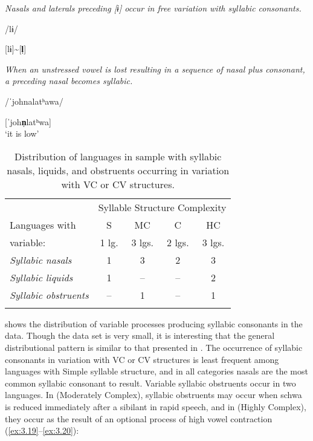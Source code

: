 \ea\label{ex:3.17}

\textit{Nasals and laterals preceding [ɨ] occur in free variation with syllabic consonants.}

/lɨ/

[lɨ]{\textasciitilde}[\textbf{l̩}]
\citep[31]{Gerner2013}
\z

\ea\label{ex:3.18}

\textit{When an unstressed vowel is lost resulting in a sequence of nasal plus consonant, a preceding nasal becomes syllabic.}

/ˈjohnalatʰawa/

[ˈjoh\textbf{n̩}latʰwa]\\
\glt ‘it is low’
\citep[262--263]{Eberhard2009}
\z

\begin{table}
\begin{tabular}{lcccc}
\lsptoprule
 & \multicolumn{4}{c}{Syllable Structure Complexity}\\\cmidrule(lr){2-5}
 Languages with  & S & MC & C & HC\\
   variable:     &   1 lg. & 3 lgs. &  2 lgs. & 3 lgs.\\\midrule
 \textit{Syllabic nasals}     & 1 & 3 & 2 & 3\\
 \textit{Syllabic liquids}    & 1 & -- & -- & 2\\
 \textit{Syllabic obstruents} & -- & 1 & -- & 1\\
\lspbottomrule
\end{tabular}
\caption{\label{tab:3.7}Distribution of languages in sample with syllabic nasals, liquids, and obstruents occurring in variation with VC or CV structures.}
\end{table}

   shows the distribution of variable processes producing syllabic consonants in the data. Though the data set is very small, it is interesting that the general distributional pattern is similar to that presented in . The occurrence of syllabic consonants in variation with VC or CV structures is least frequent among languages with Simple syllable structure, and in all categories nasals are the most common syllabic consonant to result. Variable syllabic obstruents occur in two languages. In  (Moderately Complex), syllabic obstruents may occur when schwa is reduced immediately after a sibilant in rapid speech, and in  (Highly Complex), they occur as the result of an optional process of high vowel contraction (\ref{ex:3.19}--\ref{ex:3.20}):

